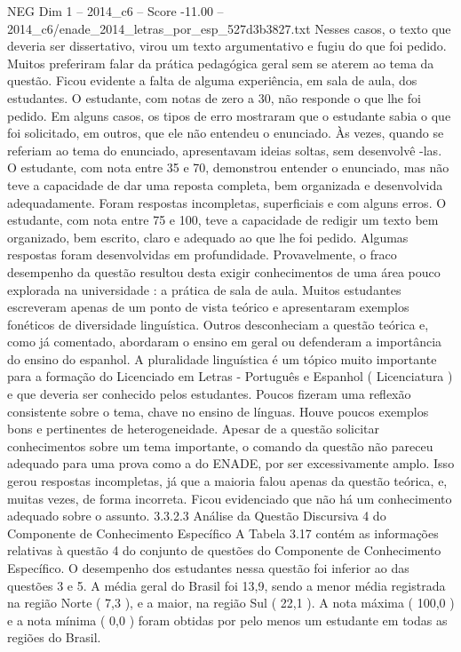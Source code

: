 \begin{textsample}{NEG Dim 1 – 2014\_c6 – Score -11.00 – 2014\_c6/enade\_2014\_letras\_por\_esp\_527d3b3827.txt}
Nesses casos, o texto que deveria ser dissertativo, virou um texto argumentativo e fugiu do que foi pedido.
Muitos preferiram falar da prática pedagógica geral sem se aterem ao tema da questão.
Ficou evidente a falta de alguma experiência, em sala de aula, dos estudantes.
O estudante, com notas de zero a 30, não responde o que lhe foi pedido.
Em alguns casos, os tipos de erro mostraram que o estudante sabia o que foi solicitado, em outros, que ele não entendeu o enunciado.
Às vezes, quando se referiam ao tema do enunciado, apresentavam ideias soltas, sem desenvolvê -las.
O estudante, com nota entre 35 e 70, demonstrou entender o enunciado, mas não teve a capacidade de dar uma reposta completa, bem organizada e desenvolvida adequadamente.
Foram respostas incompletas, superficiais e com alguns erros.
O estudante, com nota entre 75 e 100, teve a capacidade de redigir um texto bem organizado, bem escrito, claro e adequado ao que lhe foi pedido.
Algumas respostas foram desenvolvidas em profundidade.
Provavelmente, o fraco desempenho da questão resultou desta exigir conhecimentos de uma área pouco explorada na universidade : a prática de sala de aula.
Muitos estudantes escreveram apenas de um ponto de vista teórico e apresentaram exemplos fonéticos de diversidade linguística.
Outros desconheciam a questão teórica e, como já comentado, abordaram o ensino em geral ou defenderam a importância do ensino do espanhol.
A pluralidade linguística é um tópico muito importante para a formação do Licenciado em Letras - Português e Espanhol ( Licenciatura ) e que deveria ser conhecido pelos estudantes.
Poucos fizeram uma reflexão consistente sobre o tema, chave no ensino de línguas.
Houve poucos exemplos bons e pertinentes de heterogeneidade.
Apesar de a questão solicitar conhecimentos sobre um tema importante, o comando da questão não pareceu adequado para uma prova como a do ENADE, por ser excessivamente amplo.
Isso gerou respostas incompletas, já que a maioria falou apenas da questão teórica, e, muitas vezes, de forma incorreta.
Ficou evidenciado que não há um conhecimento adequado sobre o assunto. 3.3.2.3 Análise da Questão Discursiva 4 do Componente de Conhecimento Específico A Tabela 3.17 contém as informações relativas à questão 4 do conjunto de questões do Componente de Conhecimento Específico.
O desempenho dos estudantes nessa questão foi inferior ao das questões 3 e 5.
A média geral do Brasil foi 13,9, sendo a menor média registrada na região Norte ( 7,3 ), e a maior, na região Sul ( 22,1 ).
A nota máxima ( 100,0 ) e a nota mínima ( 0,0 ) foram obtidas por pelo menos um estudante em todas as regiões do Brasil.

\end{textsample}
